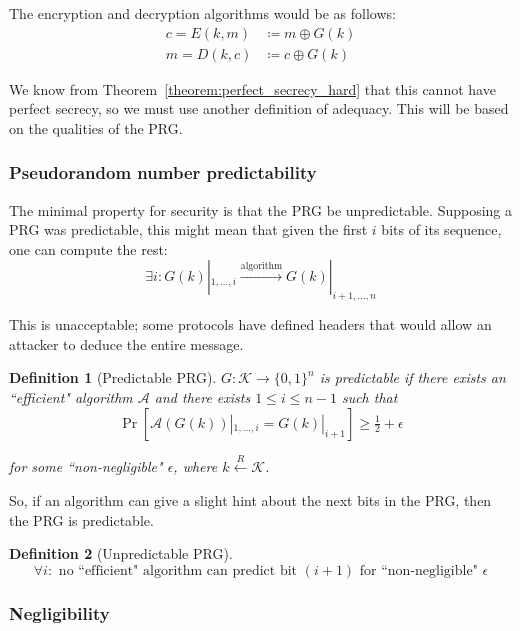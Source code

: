 \documentclass[10pt,a4paper]{report}
\newtheorem{definition}{Definition}[section]
\begin{document}
The encryption and decryption algorithms would be as follows:
\begin{equation*}
\begin{aligned}
    c = E(k, m) & \coloneqq m \oplus G(k)\\
    m = D(k, c) & \coloneqq c \oplus G(k)
\end{aligned}
\end{equation*}

We know from Theorem~\ref{theorem:perfect_secrecy_hard} that this cannot have perfect secrecy, so
we must use another definition of adequacy. This will be based on the qualities of the PRG.

\subsubsection*{Pseudorandom number predictability}

The minimal property for security is that the PRG be unpredictable. Supposing a PRG was
predictable, this might mean that given the first $i$ bits of its sequence, one can compute the
rest:
    $$ \exists i \colon G(k) |_{1, \ldots, i} \xrightarrow{\text{algorithm}} G(k) |_{i+1, \ldots,
    n} $$

This is unacceptable; some protocols have defined headers that would allow an attacker to deduce
the entire message.

\begin{definition}[Predictable PRG]
    $G \colon \mathcal{K} \to \{0, 1\}^n$ is predictable if there exists an ``efficient" algorithm
    $\mathcal{A}$ and there exists $1 \leq i \leq n-1$ such that
        $$ \operatorname{Pr}[\mathcal{A}(G(k))|_{1, \ldots, i} = G(k)|_{i+1}] \geq \tfrac{1}{2} +
           \epsilon $$

    for some ``non-negligible" $\epsilon$, where $k \xleftarrow{R} \mathcal{K}$.
\end{definition}

So, if an algorithm can give a slight hint about the next bits in the PRG, then the PRG is
predictable.

\begin{definition}[Unpredictable PRG]
    $$ \forall i \colon \text{ no ``efficient" algorithm can predict bit } (i + 1) \text{ for
    ``non-negligible" } \epsilon $$
\end{definition}

\subsubsection*{Negligibility}
\end{document}
